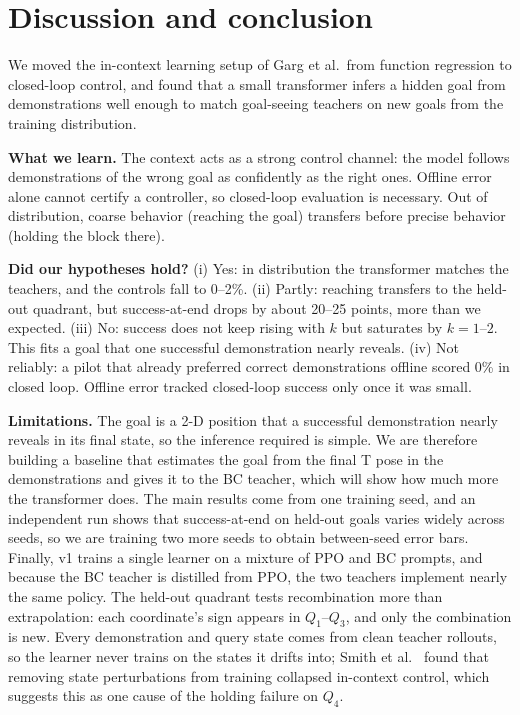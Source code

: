 \section{Discussion and conclusion}
\label{sec:conclusion}

We moved the in-context learning setup of Garg et al.\ from function regression to closed-loop control, and found that a small
transformer infers a hidden goal from demonstrations well enough to match goal-seeing teachers on new goals from the training
distribution.

\textbf{What we learn.} The context acts as a strong control channel: the model follows demonstrations of the wrong goal as
confidently as the right ones. Offline error alone cannot certify a controller, so closed-loop evaluation is necessary. Out of
distribution, coarse behavior (reaching the goal) transfers before precise behavior (holding the block there).

\textbf{Did our hypotheses hold?} %
(i) Yes: in distribution the transformer matches the teachers, and the controls fall to 0--2\%.
(ii) Partly: reaching transfers to the held-out quadrant, but success-at-end drops by about 20--25 points, more than we expected.
(iii) No: success does not keep rising with $k$ but saturates by $k = 1$--$2$. This fits a goal that one successful demonstration
nearly reveals.
(iv) Not reliably: a pilot that already preferred correct demonstrations offline scored 0\% in closed loop. Offline error tracked
closed-loop success only once it was small.

\textbf{Limitations.} The goal is a 2-D position that a successful demonstration nearly reveals in its final state, so the
inference required is simple. We are therefore building a baseline that estimates the goal from the final T pose in the
demonstrations and gives it to the BC teacher, which will show how much more the transformer does. The main results come from one
training seed, and an independent run shows that success-at-end on held-out goals varies widely across seeds, so we are training two
more seeds to obtain between-seed error bars. Finally, v1 trains a single learner on a mixture of PPO and BC prompts, and because the
BC teacher is distilled from PPO, the two teachers implement nearly the same policy. The held-out quadrant tests
recombination more than extrapolation: each coordinate's sign appears in $Q_1$--$Q_3$, and only the combination is new. Every
demonstration and query state comes from clean teacher rollouts, so the learner never trains on the states it drifts into; Smith
et al.~\cite{smith2026transformers} found that removing state perturbations from training collapsed in-context control, which
suggests this as one cause of the holding failure on $Q_4$.

